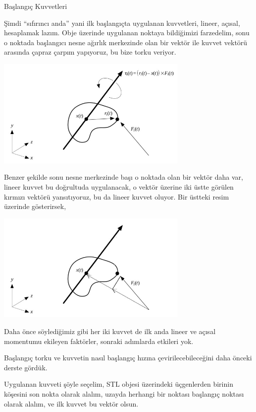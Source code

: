 \documentclass[12pt,fleqn]{article}\usepackage{../../common}
\begin{document}
Başlangıç Kuvvetleri

Şimdi ``sıfırıncı anda'' yani ilk başlangıçta uygulanan kuvvetleri, lineer,
açısal, hesaplamak lazım. Obje üzerinde uygulanan noktaya bildiğimizi
farzedelim, sonu o noktada başlangıcı nesne ağırlık merkezinde olan bir vektör
ile kuvvet vektörü arasında çapraz çarpım yapıyoruz, bu bize torku veriyor.

\includegraphics[width=25em]{phy_005_basics_06_02.jpg}

Benzer şekilde sonu nesne merkezinde başı o noktada olan bir vektör daha var,
lineer kuvvet bu doğrultuda uygulanacak, o vektör üzerine iki üstte görülen
kırmızı vektörü yansıtıyoruz, bu da lineer kuvvet oluyor. Bir üstteki resim
üzerinde gösterirsek,

\includegraphics[width=25em]{phy_005_basics_06_03.jpg}

Daha önce söylediğimiz gibi her iki kuvvet de ilk anda lineer ve açısal
momentumu ekileyen faktörler, sonraki adımlarda etkileri yok.

Başlangıç torku ve kuvvetin nasıl başlangıç hızına çevirilecebileceğini daha
önceki derste gördük.

Uygulanan kuvveti şöyle seçelim, STL objesi üzerindeki üçgenlerden birinin
köşesini son nokta olarak alalım, uzayda herhangi bir noktası başlangıç
noktası olarak alalım, ve ilk kuvvet bu vektör olsun.
\end{document}

